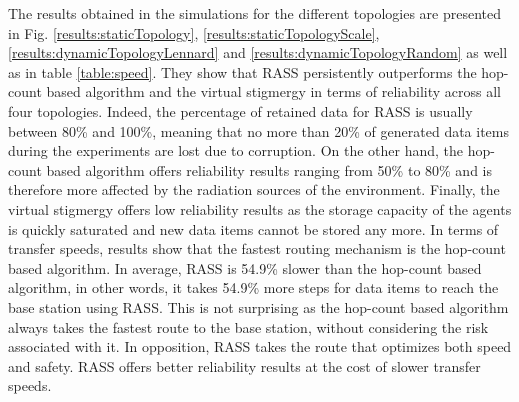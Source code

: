 The results obtained in the simulations for the different topologies are presented in Fig. \ref{results:staticTopology}, \ref{results:staticTopologyScale}, \ref{results:dynamicTopologyLennard} and \ref{results:dynamicTopologyRandom} as well as in table \ref{table:speed}. They show that RASS persistently outperforms the hop-count based algorithm and the virtual stigmergy in terms of reliability across all four topologies. Indeed, the percentage of retained data for RASS is usually between 80\% and 100\%, meaning that no more than 20\% of generated data items during the experiments are lost due to corruption. On the other hand, the hop-count based algorithm offers reliability results ranging from 50\% to 80\% and is therefore more affected by the radiation sources of the environment. Finally, the virtual stigmergy offers low reliability results as the storage capacity of the agents is quickly saturated and new data items cannot be stored any more. In terms of transfer speeds, results show that the fastest routing mechanism is the hop-count based algorithm. In average, RASS is 54.9\% slower than the hop-count based algorithm, in other words, it takes 54.9\% more steps for data items to reach the base station using RASS. This is not surprising as the hop-count based algorithm always takes the fastest route to the base station, without considering the risk associated with it. In opposition, RASS takes the route that optimizes both speed and safety. RASS offers better reliability results at the cost of slower transfer speeds.  

